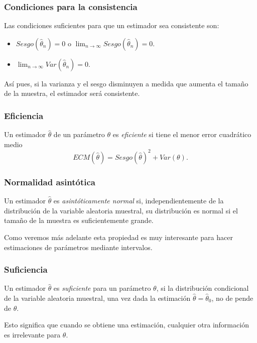 \begin{frame}
\frametitle{Condiciones para la consistencia}
Las condiciones suficientes para que un estimador sea consistente son:
\begin{itemize}
\item $Sesgo(\hat \theta_n)=0$ o $\lim_{n\rightarrow \infty}Sesgo(\hat \theta_n)=0$.
\item $\lim_{n\rightarrow \infty}Var(\hat \theta_n)=0$.
\end{itemize}
Así pues, si la varianza y el sesgo disminuyen a medida que aumenta el tamaño de la muestra, el estimador será consistente.
\end{frame}


\begin{frame}
\frametitle{Eficiencia}
\begin{definicion}
Un estimador $\hat \theta$ de un parámetro $\theta$ es \emph{eficiente} si tiene el menor error cuadrático medio
\[
ECM(\hat \theta) = Sesgo(\hat \theta)^2+Var(\theta).
\]
\end{definicion}
\begin{center}
\scalebox{0.58}{}
\end{center}
\end{frame}


\begin{frame}
\frametitle{Normalidad asintótica}
\begin{definicion}
Un estimador $\hat \theta$ es \emph{asintóticamente normal} si, independientemente de la distribución de la variable aleatoria muestral, su distribución es normal si el tamaño de la muestra es suficientemente grande. 
\end{definicion}
\begin{center}
\scalebox{0.58}{}
\end{center}
Como veremos más adelante esta propiedad es muy interesante para hacer estimaciones de parámetros mediante intervalos. 
\end{frame}

\begin{frame}
\frametitle{Suficiencia}
\begin{definicion}
Un estimador $\hat \theta$ es \emph{suficiente} para un parámetro $\theta$, si la distribución condicional de la variable aleatoria muestral, una vez dada la estimación $\hat \theta = \hat \theta_0$, no de pende de $\theta$.
\end{definicion}

Esto significa que cuando se obtiene una estimación, cualquier otra información es irrelevante para $\theta$.
\end{frame}


